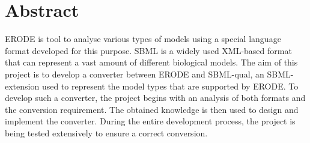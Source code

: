 \section*{Abstract}

ERODE is tool to analyse various types of models using a special language format developed for this purpose. SBML is a widely used XML-based format that can represent a vast amount of different biological models. The aim of this project is to develop a converter between ERODE and SBML-qual, an SBML-extension used to represent the model types that are supported by ERODE. To develop such a converter, the project begins with an analysis of both formats and the conversion requirement. The obtained knowledge is then used to design and implement the converter. During the entire development process, the project is being tested extensively to ensure a correct conversion.





